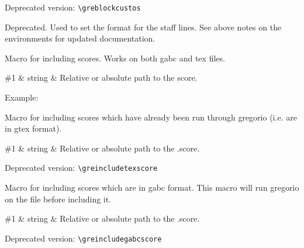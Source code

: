 \smallskip\hspace{15pt} Deprecated version: \verb=\greblockcustos=

Deprecated.  Used to set the format for the staff lines.  See above
notes on the environments for updated documentation.

Macro for including scores.  Works on both gabc and tex files.

\begin{argtable}
  \#1 & string & Relative or absolute path to the score.\\
\end{argtable}

Example:\par\medskip
\begin{latexcode}

\end{latexcode}

Macro for including scores which have already been run through
gregorio (i.e. are in gtex format).

\begin{argtable}
  \#1 & string & Relative or absolute path to the .\@gtex score.\\
\end{argtable}

\smallskip\hspace{15pt} Deprecated version: \verb=\greincludetexscore=

Macro for including scores which are in gabc format.  This macro will
run gregorio on the file before including it.

\begin{argtable}
  \#1 & string & Relative or absolute path to the .\@gabc score.\\
\end{argtable}

\smallskip\hspace{15pt} Deprecated version: \verb=\greincludegabcscore=

